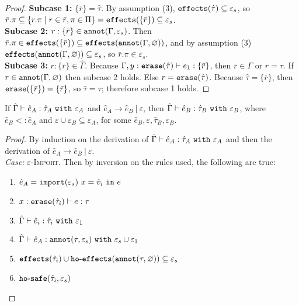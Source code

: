 \begin{appendix}
\begin{proof}
\textbf{Subcase 1:} $\{ \bar r \} = \hat \tau$. By assumption (3), $\mathtt{effects}(\hat \tau) \subseteq \varepsilon_s$, so $\bar r.\pi \subseteq \{ r.\pi \mid r \in \bar r, \pi \in \Pi \} = \mathtt{effects}(\{\bar r\}) \subseteq \varepsilon_s$. \\

\textbf{Subcase 2:} $r: \{ \bar r \} \in \mathtt{annot}(\Gamma, \varepsilon_s)$. Then $\bar r.\pi \in \mathtt{effects}(\{ \bar r \}) \subseteq \mathtt{effects}(\mathtt{annot}(\Gamma, \varnothing))$, and by assumption (3) $\mathtt{effects}(\mathtt{annot}(\Gamma, \varnothing)) \subseteq \varepsilon_s$, so $\bar r.\pi \in \varepsilon_s$.\\


\textbf{Subcase 3:} $r: \{ \bar r \} \in \hat \Gamma$. Because $\Gamma, y: \mathtt{erase}(\hat \tau) \vdash e_1: \{ \bar r \}$, then $\bar r \in \Gamma$ or $r = \tau$. If $r \in \mathtt{annot}(\Gamma, \varnothing)$ then subcase 2 holds. Else $r = \mathtt{erase}(\hat \tau)$. Because $\hat \tau = \{ \bar r \}$, then $\mathtt{erase}(\{ \bar r \}) = \{ \bar r \}$, so $\hat \tau = \tau$; therefore subcase 1 holds.
\end{proof}

\hrulefill

\begin{theorem}
If $\hat \Gamma \vdash \hat e_A: \hat \tau_A~\mathtt{with}~ \varepsilon_A$ and $\hat e_A \longrightarrow \hat e_B~|~\varepsilon$, then $\hat \Gamma \vdash \hat e_B: \hat \tau_B~\mathtt{with}~ \varepsilon_B$, where $\hat e_B <: \hat e_A$ and $\varepsilon \cup \varepsilon_B \subseteq \varepsilon_A$, for some $\hat e_B, \varepsilon, \hat \tau_B, \varepsilon_B$.
\end{theorem}

\begin{proof}
By induction on the derivation of $\hat \Gamma \vdash \hat e_A: \hat \tau_A~\mathtt{with}~ \varepsilon_A$ and then the derivation of $\hat e_A \longrightarrow \hat e_B~|~\varepsilon$. \\

\textit{Case:} \textsc{$\varepsilon$-Import}. Then by inversion on the rules used, the following are true:

\begin{enumerate}
	\setlength\itemsep{-0.7em}
	\item $\hat e_A = \mathtt{import}(\varepsilon_s)~x = \hat v_i~\mathtt{in}~ e$
	\item $x: \mathtt{erase}(\hat \tau_i) \vdash e: \tau$
	\item $\hat \Gamma \vdash \hat e_i: \hat \tau_i~\mathtt{with}~ \varepsilon_1$
	\item $\hat \Gamma \vdash \hat e_A: \mathtt{annot}(\tau, \varepsilon_s)~\mathtt{with}~ \varepsilon_s \cup \varepsilon_1$
	\item $\mathtt{effects}(\hat \tau_i) \cup \mathtt{ho \hbox{-} effects}(\mathtt{annot}(\tau, \varnothing)) \subseteq \varepsilon_s$
	\item $\mathtt{ho \hbox{-} safe}(\hat \tau_i, \varepsilon_s)$
\end{enumerate}


\end{proof}
\end{appendix}

